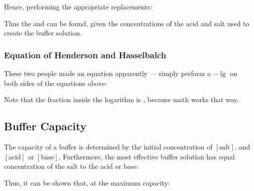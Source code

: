 			Hence, performing the appropriate replacements:

			\mathdiagram{
				\[ \MKa = \frac{[\ch{H+}]_{eqm}[\mathrm{salt}]}{[\mathrm{acid}]} \hspace{12mm}
					\MKb = \frac{[\ch{OH-}]_{eqm}[\mathrm{salt}]}{[\mathrm{base}]} \]
			}

			\mathdiagram{
				\[ [\ch{H+}]_{eqm} = \MKa \times \frac{[\mathrm{acid}]}{[\mathrm{salt}]} \hspace{12mm}
					[\ch{OH-}]_{eqm} = \MKb \times \frac{[\mathrm{base}]}{[\mathrm{salt}]} \]
			}


			Thus the \pH{} and \pOH{} can be found, given the concentrations of the acid and salt used to create the buffer solution.

			\subsubsection{Equation of Henderson and Hasselbalch}

				These two people made an equation apparently --- simply perform a $-\lg{}$ on both sides of the equations above:
				\mathdiagram{
					\[ \MpH = \MpKa + \lg{\frac{[\mathrm{salt}]}{[\mathrm{acid}]}}    \hspace{12mm}
						\MpOH = \MpKb + \lg{\frac{[\mathrm{salt}]}{[\mathrm{base}]}} \]
				}

				Note that the fraction inside the logarithm is , because math works that way.




		\subsection{Buffer Capacity}

			The capacity of a buffer is determined by the initial concentration of $[\mathrm{salt}]$, and $[\mathrm{acid}]$ or $[\mathrm{base}]$.
			Furthermore, the most effective buffer solution has equal concentration of the salt to the acid or base:

			\mathdiagram{
				\[ \frac{[\mathrm{salt}]}{[\mathrm{acid}]} = 1 \hspace{12mm}
					\frac{[\mathrm{salt}]}{[\mathrm{base}]} = 1\]
			}

			Thus, it can be shown that, at the maximum capacity:

			\mathdiagram{
				\[ \MpH = \MpKa \hspace{12mm} \MpOH = \MpKb \]
			}

